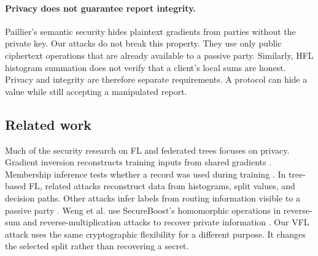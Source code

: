 \documentclass[11pt]{article}
\begin{document}
\paragraph{Privacy does not guarantee report integrity.}
Paillier's semantic security hides plaintext gradients from parties without the private key. Our attacks do not break this property. They use only public ciphertext operations that are already available to a passive party. Similarly, HFL histogram summation does not verify that a client's local sums are honest. Privacy and integrity are therefore separate requirements. A protocol can hide a value while still accepting a manipulated report.

\subsection{Related work}

Much of the security research on FL and federated trees focuses on privacy. Gradient inversion reconstructs training inputs from shared gradients \cite{zhu2019deepleakage}. Membership inference tests whether a record was used during training \cite{shokri2017membership}. In tree-based FL, related attacks reconstruct data from histograms, split values, and decision paths. Other attacks infer labels from routing information visible to a passive party \cite{luo2021feature,digennaro2025timberstrike}. Weng et al. use SecureBoost's homomorphic operations in reverse-sum and reverse-multiplication attacks to recover private information \cite{weng2020privacy}. Our VFL attack uses the same cryptographic flexibility for a different purpose. It changes the selected split rather than recovering a secret.
\end{document}
